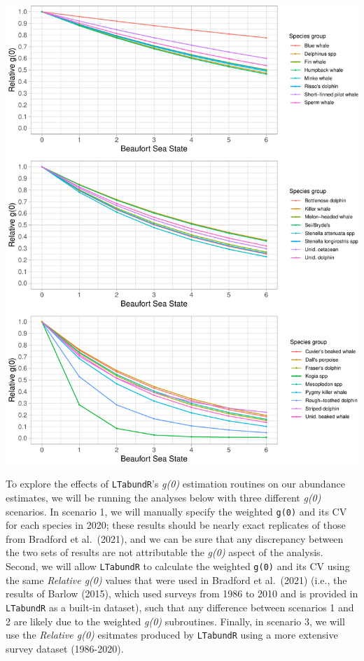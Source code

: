 \documentclass[
]{book}
\begin{document}
\includegraphics{figures/unnamed-chunk-341-1.pdf}

To explore the effects of \texttt{LTabundR}'s \emph{g(0)} estimation routines on our abundance estimates, we will be running the analyses below with three different \emph{g(0)} scenarios. In scenario 1, we will manually specify the weighted \texttt{g(0)} and its CV for each species in 2020; these results should be nearly exact replicates of those from Bradford et al.~(2021), and we can be sure that any discrepancy between the two sets of results are not attributable the \emph{g(0)} aspect of the analysis. Second, we will allow \texttt{LTabundR} to calculate the weighted \texttt{g(0)} and its CV using the same \emph{Relative g(0)} values that were used in Bradford et al.~(2021) (i.e., the results of Barlow (2015), which used surveys from 1986 to 2010 and is provided in \texttt{LTabundR} as a built-in dataset), such that any difference between scenarios 1 and 2 are likely due to the weighted \emph{g(0)} subroutines. Finally, in scenario 3, we will use the \emph{Relative g(0)} esitmates produced by \texttt{LTabundR} using a more extensive survey dataset (1986-2020).
\end{document}

